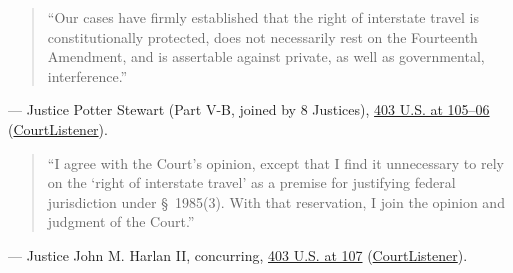 \documentclass[12pt]{article}
\begin{document}
\begin{quote}
``Our cases have firmly established that the right of interstate travel is constitutionally protected, does not necessarily rest on the Fourteenth Amendment, and is assertable against private, as well as governmental, interference.''
\end{quote}
\noindent --- Justice Potter Stewart (Part V-B, joined by 8 Justices), \href{https://supreme.justia.com/cases/federal/us/403/88/}{403 U.S. at 105--06} (\href{https://www.courtlistener.com/opinion/108362/griffin-v-breckenridge/}{CourtListener}).

\begin{quote}
``I agree with the Court's opinion, except that I find it unnecessary to rely on the `right of interstate travel' as a premise for justifying federal jurisdiction under \S~1985(3). With that reservation, I join the opinion and judgment of the Court.''
\end{quote}
\noindent --- Justice John M. Harlan II, concurring, \href{https://supreme.justia.com/cases/federal/us/403/88/}{403 U.S. at 107} (\href{https://www.courtlistener.com/opinion/108362/griffin-v-breckenridge/}{CourtListener}).
\end{document}
